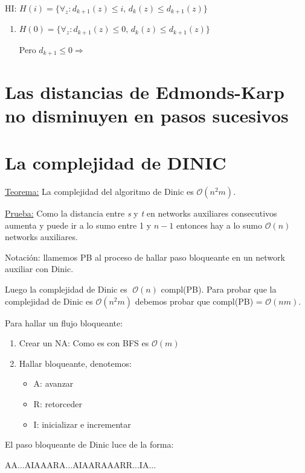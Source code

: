 \documentclass[12pt,a4paper]{report}
\begin{document}
		\begin{center}
			HI: $H(i) = \lbrace\forall_{z}: d_{k+1}(z) \leq \textit{i}, \, d_{k}(z) \leq d_{k+1}(z)  \rbrace$
		\end{center}
		
		\begin{enumerate}
			\item $H(0) = \lbrace\forall_{z}: d_{k+1}(z) \leq 0, \, d_{k}(z) \leq d_{k+1}(z)  \rbrace$
			
			Pero $d_{k+1} \leq 0 \Rightarrow $
		\end{enumerate}
		
		
	\section{Las distancias de Edmonds-Karp no disminuyen en pasos sucesivos}

	
	\section{La complejidad de DINIC}

		\underline{Teorema:} La complejidad del algoritmo de Dinic es $\mathcal{O}(n^{2}m)$.
		
		\underline{Prueba:} Como la distancia entre \textit{s} y \textit{t} en networks auxiliares consecutivos aumenta y puede ir a lo sumo entre 1 y $n-1$ entonces hay a lo sumo $\mathcal{O}(n)$ networks auxiliares.
		
		Notación: llamemos PB al proceso de hallar paso bloqueante en un network auxiliar con Dinic.

		Luego la complejidad de Dinic es $ \; \mathcal{O}(n)$ compl(PB). Para probar que la complejidad de Dinic es $\mathcal{O}(n^{2}m)$ debemos probar que compl(PB) = $\mathcal{O}(nm)$.

		Para hallar un flujo bloqueante:
		\begin{enumerate}
			\item Crear un NA: Como es con BFS es $\mathcal{O}(m)$
			\item Hallar bloqueante, denotemos:
				\begin{itemize}
					\item A: avanzar
					\item R: retorceder
					\item I: inicializar e incrementar
				\end{itemize}
		\end{enumerate}
		
		El paso bloqueante de Dinic luce de la forma:
		\begin{center}
			AA...AIAAARA...AIAARAAARR...IA...
		\end{center}
		
\end{document}
